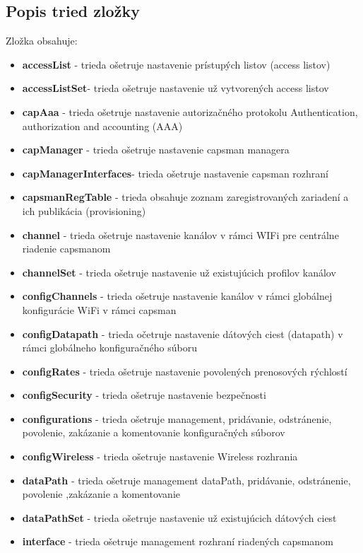 \subsection{Popis tried zložky}
Zložka obsahuje:\begin{itemize}
\item \textbf{accessList} - trieda ošetruje nastavenie prístupých listov (access listov)
\item \textbf{accessListSet}- trieda ošetruje nastavenie už vytvorených access listov
\item \textbf{capAaa} - trieda ošetruje nastavenie autorizačného protokolu  Authentication, authorization and accounting (AAA)
\item \textbf{capManager} - trieda ošetruje nastavenie capsman managera
\item \textbf{capManagerInterfaces}- trieda ošetruje nastavenie capsman rozhraní
\item \textbf{capsmanRegTable} - trieda obsahuje zoznam zaregistrovaných zariadení  a ich publikácia (provisioning)
\item \textbf{channel} - trieda ošetruje nastavenie kanálov v rámci WIFi pre centrálne riadenie capsmanom
\item \textbf{channelSet} - trieda ošetruje nastavenie už existujúcich profilov kanálov 
\item \textbf{configChannels} - trieda ošetruje nastavenie kanálov v rámci globálnej konfigurácie WiFi v rámci  capsman
\item \textbf{configDatapath} - trieda očetruje nastavenie dátových ciest (datapath) v rámci globálneho konfiguračného súboru 
\item \textbf{configRates} - trieda ošetruje nastavenie povolených prenosových rýchlostí 
\item \textbf{configSecurity} - trieda ošetruje nastavenie bezpečnosti
\item \textbf{configurations} - trieda ošetruje management, pridávanie, odstránenie, povolenie, zakázanie a komentovanie konfiguračných súborov
\item \textbf{configWireless} - trieda ošetruje nastavenie Wireless rozhrania
\item \textbf{dataPath} - trieda ošetruje management dataPath, pridávanie, odstránenie, povolenie ,zakázanie a komentovanie
\item \textbf{dataPathSet} - trieda ošetruje nastavenie už existujúcich dátových ciest
\item \textbf{interface} - trieda ošetruje management rozhraní riadených capsmanom

\end{itemize}
